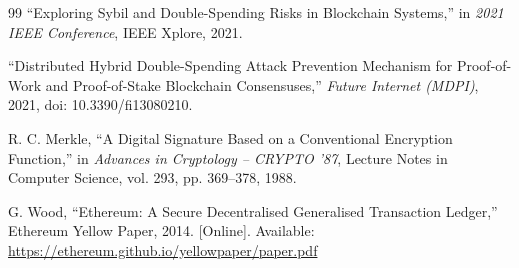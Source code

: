 \documentclass[12pt,a4paper]{report}
\begin{document}
\begin{thebibliography}{99}
``Exploring Sybil and Double-Spending Risks in Blockchain Systems,''
in \textit{2021 IEEE Conference}, IEEE Xplore, 2021.

``Distributed Hybrid Double-Spending Attack Prevention Mechanism for Proof-of-Work and
Proof-of-Stake Blockchain Consensuses,''
\textit{Future Internet (MDPI)}, 2021, doi: 10.3390/fi13080210.

R. C. Merkle,
``A Digital Signature Based on a Conventional Encryption Function,''
in \textit{Advances in Cryptology -- CRYPTO '87},
Lecture Notes in Computer Science, vol. 293, pp. 369--378, 1988.

G. Wood,
``Ethereum: A Secure Decentralised Generalised Transaction Ledger,''
Ethereum Yellow Paper, 2014.
[Online]. Available: \url{https://ethereum.github.io/yellowpaper/paper.pdf}

\end{thebibliography}
\end{document}

